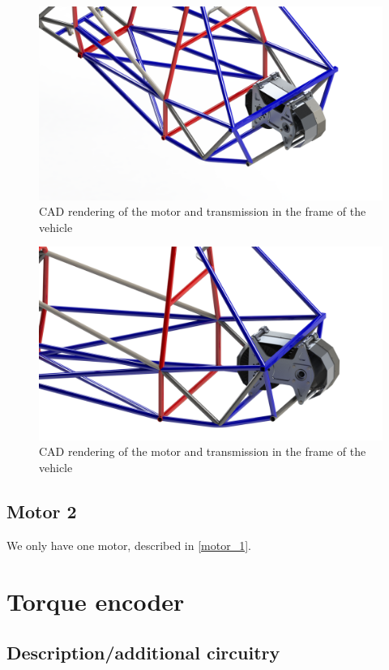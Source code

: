 \documentclass{article}
\begin{document}
\begin{figure}[H]
    \centering
    \includegraphics[width = 0.8 \textwidth]{motor_iso}
    \caption{CAD rendering of the motor and transmission in the frame of the vehicle}
    \label{motor_iso}
\end{figure}

\begin{figure}[H]
    \centering
    \includegraphics[width = 0.8 \textwidth]{motor_dimetric}
    \caption{CAD rendering of the motor and transmission in the frame of the vehicle}
    \label{motor_dimetric}
\end{figure}

\subsection{Motor 2}\label{motor_2}
We only have one motor, described in \ref{motor_1}.

\section{Torque encoder}\label{torque_encoder}
\subsection{Description/additional circuitry}
\end{document}

